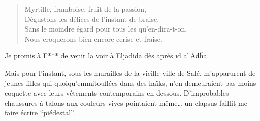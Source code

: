 \begin{verse}
Myrtille, framboise, fruit de la passion,\\
Dégustons les délices de l’instant de braise.\\
Sans le moindre égard pour tous les qu’en-dira-t-on,\\
Nous croquerons bien encore cerise et fraise.
\end{verse}

\begin{prose}
Je promis à F*** de venir la voir à Eljadida dès après īd al\,Aḋĥā.
\end{prose}

\begin{prose}
Mais pour l’instant, sous les murailles de la vieille ville de Salé, m’apparurent de jeunes filles qui quoiqu’emmitouflées dans des haïks, n’en demeuraient pas moins coquette avec leurs vêtements contemporains en dessous. D’improbables chaussures à talons aux couleurs vives pointaient même… un clapsus faillit me faire écrire \enquote{piédestal}.
\end{prose}

